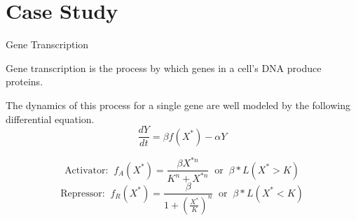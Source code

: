 \documentclass{beamer}
\begin{document}
\section{Case Study}

\begin{frame}{Gene Transcription}
    \begin{large}
        Gene transcription is the process by which genes in a cell’s DNA produce proteins.

        \vspace*{0.125in}
        The dynamics of this process for a single gene are well modeled by the following differential equation.
        $$\frac{dY}{dt}=\beta f(X^*) - \alpha Y$$

        $$\text{Activator: } \ f_A(X^*)=\frac{\beta X^{*n}}{K^n + X^{*n}} \ \text{ or } \ \beta * L(X^* > K)$$
        $$\text{Repressor: } \ f_R(X^*)=\frac{\beta}{1 + \left(\frac{X^*}{K}\right)^n} \ \text{ or } \ \beta * L(X^* < K)$$

    \end{large}
\end{frame}
\end{document}
